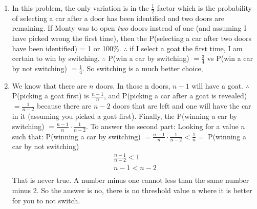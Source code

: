 \documentclass[11pt]{article}
\begin{document}
\begin{flushleft}
\begin{enumerate}
{\begin{enumerate}
				      		\item { %
				      			      In this problem, the only variation is in the $\frac{1}{2}$ factor which is the probability of selecting a car after a door has been identified and two doors are remaining. If Monty was to open \emph{two} doors instead of one (and assuming I have picked wrong the first time), then the P(selecting a car after two doors have been identified) = 1 or 100\%. $\therefore$ if I select a goat the first time, I am certain to win by switching.\linebreak\linebreak
				      			      $\therefore$ P(win a car by switching) $= \frac{3}{4}$ vs P(win a car by not switching) $= \frac{1}{4}$. So switching is a much better choice,
				      			}
				      			
				      			\item {
				      				      We know that there are $n$ doors. In those n doors, $n-1$ will have a goat. $\therefore $ P(picking a goat first) is $\frac{n-1}{n}$, and P(picking a car after a goat is revealed) $= \frac{1}{n - 2}$ because there are $n-2$ doors that are left and one will have the car in it (assuming you picked a goat first). Finally, the P(winning a car by switching) $= \frac{n-1}{n} \cdot \frac{1}{n - 2}$. To answer the second part:\linebreak\linebreak
				      				      Looking for a value $n$ such that:\linebreak
				      				      P(winning a car by switching) $= \frac{n-1}{n} \cdot \frac{1}{n - 2} < \frac{1}{n} =$ P(winning a car by not switching)
				      				      \begin{equation*}
				      				      	\begin{split}
				      				      		\frac{n-1}{n - 2} < 1\\
				      				      		n-1 < n - 2\\
				      				      	\end{split}
				      				      \end{equation*}
				      				      That is never true. A number minus one cannot less than the same number minus 2. So the answer is no, there is no threshold value n where it is better for you to not switch.
				      				}
				      				

\end{enumerate}}
\end{enumerate}
\end{flushleft}
\end{document}
